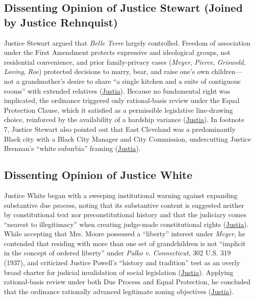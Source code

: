 \documentclass[12pt]{article}
\begin{document}
\subsection{Dissenting Opinion of Justice Stewart (Joined by Justice Rehnquist)}
Justice Stewart argued that \textit{Belle Terre} largely controlled. Freedom of association under the First Amendment protects expressive and ideological groups, not residential convenience, and prior family-privacy cases (\textit{Meyer}, \textit{Pierce}, \textit{Griswold}, \textit{Loving}, \textit{Roe}) protected decisions to marry, bear, and raise one's own children---not a grandmother's desire to share ``a single kitchen and a suite of contiguous rooms'' with extended relatives (\href{https://supreme.justia.com/cases/federal/us/431/494/}{Justia}). Because no fundamental right was implicated, the ordinance triggered only rational-basis review under the Equal Protection Clause, which it satisfied as a permissible legislative line-drawing choice, reinforced by the availability of a hardship variance (\href{https://supreme.justia.com/cases/federal/us/431/494/}{Justia}). In footnote 7, Justice Stewart also pointed out that East Cleveland was a predominantly Black city with a Black City Manager and City Commission, undercutting Justice Brennan's ``white suburbia'' framing (\href{https://supreme.justia.com/cases/federal/us/431/494/}{Justia}).

\subsection{Dissenting Opinion of Justice White}
Justice White began with a sweeping institutional warning against expanding substantive due process, noting that its substantive content is suggested neither by constitutional text nor preconstitutional history and that the judiciary comes ``nearest to illegitimacy'' when creating judge-made constitutional rights (\href{https://supreme.justia.com/cases/federal/us/431/494/}{Justia}). While accepting that Mrs. Moore possessed a ``liberty'' interest under \textit{Meyer}, he contended that residing with more than one set of grandchildren is not ``implicit in the concept of ordered liberty'' under \textit{Palko v. Connecticut}, 302 U.S. 319 (1937), and criticized Justice Powell's ``history and tradition'' test as an overly broad charter for judicial invalidation of social legislation (\href{https://supreme.justia.com/cases/federal/us/431/494/}{Justia}). Applying rational-basis review under both Due Process and Equal Protection, he concluded that the ordinance rationally advanced legitimate zoning objectives (\href{https://supreme.justia.com/cases/federal/us/431/494/}{Justia}).
\end{document}

